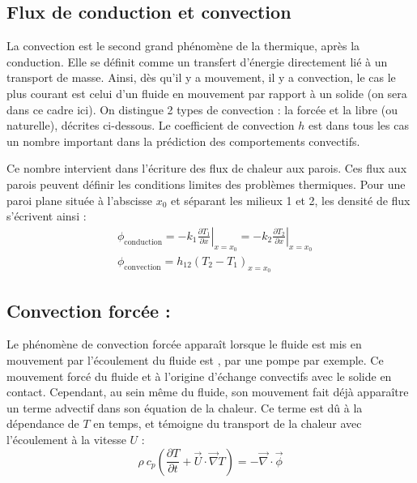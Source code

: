 

\subsection{Flux de conduction et convection}
La convection est le second grand phénomène de la thermique, après la conduction. Elle se définit comme un transfert d'énergie directement lié à un transport de masse. Ainsi, dès qu'il y a mouvement, il y a convection, le cas le plus courant est celui d'un fluide en mouvement par rapport à un solide (on sera dans ce cadre ici). On distingue 2 types de convection : la forcée et la libre (ou naturelle), décrites ci-dessous. Le coefficient de convection $h$ est dans tous les cas un nombre important dans la prédiction des comportements convectifs.

Ce nombre intervient dans l'écriture des flux de chaleur aux parois. Ces flux aux parois peuvent définir les conditions limites des problèmes thermiques. Pour une paroi plane située à l'abscisse $x_0$ et séparant les milieux 1 et 2, les densité de flux s'écrivent ainsi :
%
\begin{align}[left=\empheqlbrace]
 &\phi_{\text{conduction}}
 = - k_1 \left. \frac{\partial{T_1}}{\partial{x}} \right|_{x=x_0}
 = - k_2 \left. \frac{\partial{T_2}}{\partial{x}} \right|_{x=x_0} \\
 &\phi_{\text{convection}}
 = h_{12} \left( T_2 - T_1 \right)_{x=x_0}
 \label{eq:fluxth}
\end{align}


\subsection{Convection forcée :}
Le phénomène de convection forcée apparaît lorsque le fluide est mis en mouvement par
l'écoulement du fluide est , par une pompe par exemple. Ce mouvement forcé du fluide et à l'origine d'échange convectifs avec le solide en contact. Cependant, au sein même du fluide, son mouvement fait déjà apparaître un terme advectif dans son équation de la chaleur. Ce terme est dû à la dépendance de $T$ en temps, et témoigne du transport de la chaleur avec l'écoulement à la vitesse $U$ :
%
\begin{equation}
\rho~c_{p} \left( \frac{\partial T}{\partial t}
+ \vec{U} \cdot \vec{\nabla} T \right)
= - \vec{\nabla} \cdot \vec{\phi}
\end{equation}


